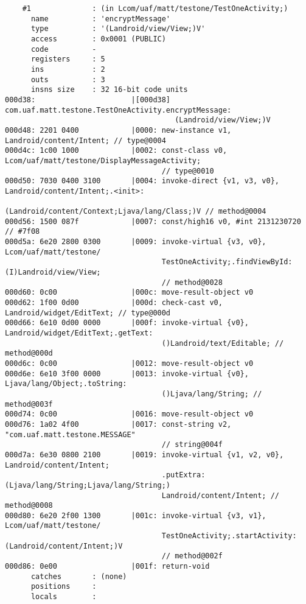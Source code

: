 \begin{lstlisting}
    #1              : (in Lcom/uaf/matt/testone/TestOneActivity;)
      name          : 'encryptMessage'
      type          : '(Landroid/view/View;)V'
      access        : 0x0001 (PUBLIC)
      code          -
      registers     : 5
      ins           : 2
      outs          : 3
      insns size    : 32 16-bit code units
000d38:                      |[000d38] com.uaf.matt.testone.TestOneActivity.encryptMessage:
                                       (Landroid/view/View;)V
000d48: 2201 0400            |0000: new-instance v1, Landroid/content/Intent; // type@0004
000d4c: 1c00 1000            |0002: const-class v0, Lcom/uaf/matt/testone/DisplayMessageActivity;
                                    // type@0010
000d50: 7030 0400 3100       |0004: invoke-direct {v1, v3, v0}, Landroid/content/Intent;.<init>:
                                    (Landroid/content/Context;Ljava/lang/Class;)V // method@0004
000d56: 1500 087f            |0007: const/high16 v0, #int 2131230720 // #7f08
000d5a: 6e20 2800 0300       |0009: invoke-virtual {v3, v0}, Lcom/uaf/matt/testone/
                                    TestOneActivity;.findViewById:(I)Landroid/view/View;
                                    // method@0028
000d60: 0c00                 |000c: move-result-object v0
000d62: 1f00 0d00            |000d: check-cast v0, Landroid/widget/EditText; // type@000d
000d66: 6e10 0d00 0000       |000f: invoke-virtual {v0}, Landroid/widget/EditText;.getText:
                                    ()Landroid/text/Editable; // method@000d
000d6c: 0c00                 |0012: move-result-object v0
000d6e: 6e10 3f00 0000       |0013: invoke-virtual {v0}, Ljava/lang/Object;.toString:
                                    ()Ljava/lang/String; // method@003f
000d74: 0c00                 |0016: move-result-object v0
000d76: 1a02 4f00            |0017: const-string v2, "com.uaf.matt.testone.MESSAGE"
                                    // string@004f
000d7a: 6e30 0800 2100       |0019: invoke-virtual {v1, v2, v0}, Landroid/content/Intent;
                                    .putExtra:(Ljava/lang/String;Ljava/lang/String;)
                                    Landroid/content/Intent; // method@0008
000d80: 6e20 2f00 1300       |001c: invoke-virtual {v3, v1}, Lcom/uaf/matt/testone/
                                    TestOneActivity;.startActivity:(Landroid/content/Intent;)V
                                    // method@002f
000d86: 0e00                 |001f: return-void
      catches       : (none)
      positions     :
      locals        :


\end{lstlisting}
